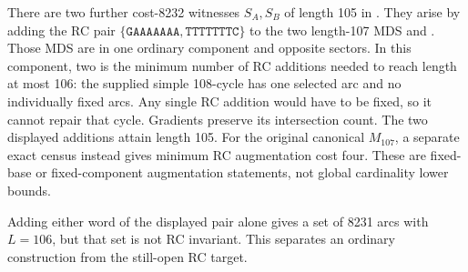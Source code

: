 There are two further cost-8232 witnesses $S_A,S_B$ of length 105
in . They arise by adding the RC pair
$\{\texttt{GAAAAAAA},\texttt{TTTTTTTC}\}$ to the two length-107
MDS  and
. Those MDS are in one ordinary
component and opposite sectors. In this component, two is the
minimum number of RC additions needed to reach length at most 106:
the supplied simple 108-cycle has one selected arc and no
individually fixed arcs. Any single RC addition would have to be
fixed, so it cannot repair that cycle. Gradients preserve its
intersection count. The two displayed additions attain length 105.
For the original canonical $M_{107}$, a separate exact census
instead gives minimum RC augmentation cost four. These are
fixed-base or fixed-component augmentation statements, not
global cardinality lower bounds.

Adding either word of the displayed pair alone gives a set of
8231 arcs with $L=106$, but that set is not RC invariant. This
separates an ordinary construction from the still-open RC target.

